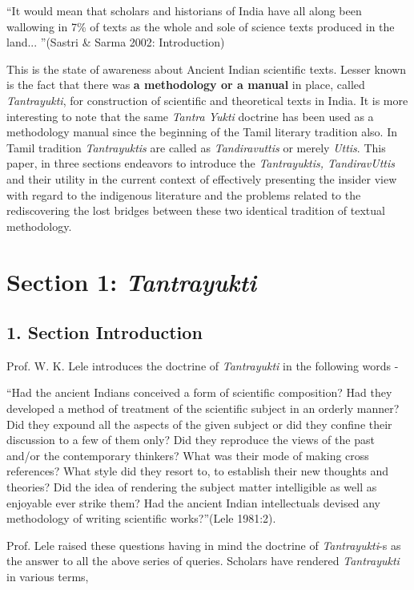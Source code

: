“It would mean that scholars and historians of India have all along been wallowing in 7\% of texts as the whole and sole of science texts produced in the land... ”\hfill (Sastri \& Sarma 2002: Introduction)

This is the state of awareness about Ancient Indian scientific texts. Lesser known is the fact that there was \textbf{a methodology or a manual} in place, called \textit{Tantrayukti}, for construction of scientific and theoretical texts in India. It is more interesting to note that the same \textit{Tantra Yukti} doctrine has been used as a methodology manual since the beginning of the Tamil literary tradition also. In Tamil tradition \textit{Tantrayuktis} are called as \textit{Tandiravuttis} or merely \textit{Uttis}. This paper, in three sections endeavors to introduce the \textit{Tantrayuktis, TandiravUttis} and their utility in the current context of effectively presenting the insider view with regard to the indigenous literature and the problems related to the rediscovering the lost bridges between these two identical tradition of textual methodology.


\section*{Section 1: \textit{Tantrayukti}}

\subsection*{1. Section Introduction }

Prof. W. K. Lele introduces the doctrine of \textit{Tantrayukti} in the following words -

“Had the ancient Indians conceived a form of scientific composition? Had they developed a method of treatment of the scientific subject in an orderly manner? Did they expound all the aspects of the given subject or did they confine their discussion to a few of them only? Did they reproduce the views of the past and/or the contemporary thinkers? What was their mode of making cross references? What style did they resort to, to establish their new thoughts and theories? Did the idea of rendering the subject matter intelligible as well as enjoyable ever strike them? Had the ancient Indian intellectuals devised any methodology of writing scientific works?”\hfill (Lele 1981:2).

Prof. Lele raised these questions having in mind the doctrine of \textit{Tantrayukti}-s as the answer to all the above series of queries. Scholars have rendered \textit{Tantrayukti} in various terms,


